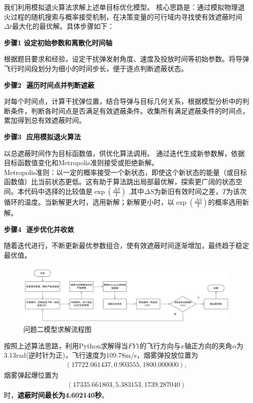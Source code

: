 \documentclass[../main.tex]{subfiles}
\begin{document}

我们利用模拟退火算法求解上述单目标优化模型。
核心思路是：通过模拟物理退火过程的随机搜索与概率接受机制，在决策变量的可行域内寻找使有效遮蔽时间$\Delta t$最大化的最优解。具体步骤如下：

\noindent \textbf{步骤1$\,\,$设定初始参数和离散化时间轴}

根据题目要求和经验，设定干扰弹发射角度、速度及投放时间等初始参数。将导弹飞行时间段划分为细小的时间步长，便于逐点判断遮蔽状态。

\noindent \textbf{步骤2 $\,\,$遍历时间点并判断遮蔽}

对每个时间点，计算干扰弹位置，结合导弹与目标几何关系，根据模型分析中的判断条件，判断各时间点是否满足有效遮蔽条件。收集所有满足遮蔽条件的时间点，累加得到总有效遮蔽时间。

\noindent \textbf{步骤3 $\,\,$应用模拟退火算法}

 以总遮蔽时间作为目标函数值，供优化算法调用。
 通过迭代生成新参数解，依据目标函数值变化和Metropolis准则接受或拒绝新解。\\
    Metropolis准则：以一定的概率接受一个新状态，即使这个新状态的能量（或目标函数值）比当前状态更低。这有助于算法跳出局部最优解，探索更广阔的状态空间。本代码中选择的比较值是$\exp \left( \frac{\Delta S}{T} \right)$ ,其中$\Delta S$为新旧有效时间之差，$T$为该次循环的温度。当新解更大时，选用新解；新解更小时，以$\exp \left( \frac{\Delta S}{T} \right)$的概率选用新解。

\noindent \textbf{步骤4 $\,\,$逐步优化并收敛}

随着迭代进行，不断更新最优参数组合，使有效遮蔽时间逐渐增加，最终趋于稳定最优值。
\begin{figure}[H]
\centering
\includegraphics[scale=0.35]{问题二模型求解流程图.png}
\caption{问题二模型求解流程图}
\label{图2}
\end{figure}

按照上述算法思路，利用Python求解得当$FY1$的飞行方向与$x$轴正方向的夹角$\alpha$为3.13rad(逆时针为正)，飞行速度为109.78m/s，烟雾弹投放位置为
\begin{align}
(17722.061437,0.903555,1800.000000),
\end{align}
烟雾弹起爆位置为
\begin{align}
(17335.661803,5.383153,1739.287040)
\end{align}
时，\textbf{遮蔽时间最长为4.602140秒}。
\end{document}
